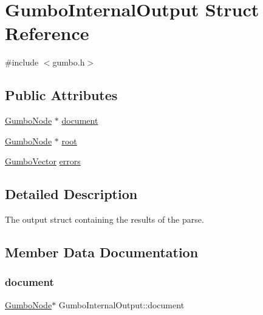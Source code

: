 \hypertarget{struct_gumbo_internal_output}{}\section{Gumbo\+Internal\+Output Struct Reference}
\label{struct_gumbo_internal_output}


{\ttfamily \#include $<$gumbo.\+h$>$}

\subsection*{Public Attributes}
\begin{DoxyCompactItemize}
\item 
\mbox{\hyperlink{gumbo_8h_a5f67d8397fda8fb7c90cc27f14ac4e7d}{Gumbo\+Node}} $\ast$ \mbox{\hyperlink{struct_gumbo_internal_output_afe1fd4f60f97ef92ba3e74b56ac524c8}{document}}
\item 
\mbox{\hyperlink{gumbo_8h_a5f67d8397fda8fb7c90cc27f14ac4e7d}{Gumbo\+Node}} $\ast$ \mbox{\hyperlink{struct_gumbo_internal_output_a158c3dc79c61a8b4e0d7d95d2d3f4289}{root}}
\item 
\mbox{\hyperlink{struct_gumbo_vector}{Gumbo\+Vector}} \mbox{\hyperlink{struct_gumbo_internal_output_a8e748fc7e9c1fd09df1ff2dde4bfda45}{errors}}
\end{DoxyCompactItemize}


\subsection{Detailed Description}
The output struct containing the results of the parse. 

\subsection{Member Data Documentation}
\mbox{\label{struct_gumbo_internal_output_afe1fd4f60f97ef92ba3e74b56ac524c8}} 
\subsubsection{\texorpdfstring{document}{document}}
{\footnotesize\ttfamily \mbox{\hyperlink{gumbo_8h_a5f67d8397fda8fb7c90cc27f14ac4e7d}{Gumbo\+Node}}$\ast$ Gumbo\+Internal\+Output\+::document}

